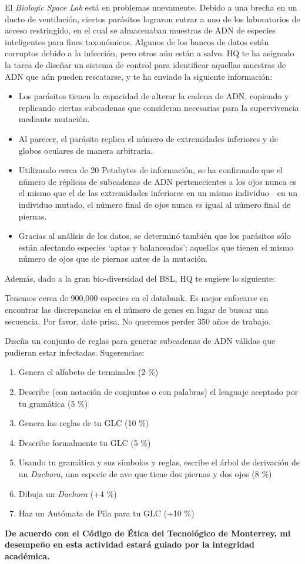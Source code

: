 \documentclass[8pt, onside]{article}
\begin{document}
El \textit{Biologic Space Lab} está en problemas nuevamente.
Debido a una brecha en un ducto de ventilación, ciertos parásitos lograron entrar a uno de los laboratorios de acceso restringido, en el cual se almacenaban muestras de ADN de especies inteligentes para fines taxonómicos.
Algunos de los bancos de datos están corruptos debido a la infección, pero otros aún están a salvo.
HQ te ha asignado la tarea de diseñar un sistema de control para identificar aquellas muestras de ADN que aún pueden rescatarse, y te ha enviado la siguiente información:

\begin{itemize}
    \itemsep0em
    \item Los parásitos tienen la capacidad de alterar la cadena de ADN, copiando y replicando ciertas subcadenas que consideran necesarias para la supervivencia mediante mutación.
    \item Al parecer, el parásito replica el número de extremidades inferiores y de globos oculares de manera arbitraria.
    \item Utilizando cerca de 20 Petabytes de información, se ha confirmado que el número de réplicas de subcadenas de ADN pertenecientes a los ojos nunca es el mismo que el de las extremidades inferiores en un mismo individuo---en un individuo mutado, el número final de ojos nunca es igual al número final de piernas.
    \item Gracias al análisis de los datos, se determinó también que los parásitos sólo están afectando especies `aptas y balanceadas'; aquellas que tienen el mismo número de ojos que de piernas antes de la mutación.
\end{itemize}

Además, dado a la gran bio-diversidad del BSL, HQ te sugiere lo siguiente:

\begin{tcolorbox}
{\small Tenemos cerca de 900,000 especies en el databank.
Es mejor enfocarse en encontrar las discrepancias en el número de genes en lugar de buscar una secuencia.
Por favor, date prisa. No queremos perder 350 años de trabajo.}
\end{tcolorbox}

Diseña un conjunto de reglas para generar subcadenas de ADN válidas que pudieran estar infectadas. Sugerencias:

\begin{enumerate}[label=\tt \alph*)]
    \item Genera el alfabeto de terminales (2 \%)
    \item Describe (con notación de conjuntos o con palabras) el lenguaje aceptado por tu gramática (5 \%)
    \item Genera las reglas de tu GLC (10 \%)
    \item Describe formalmente tu GLC (5 \%)
    \item Usando tu gramática y sus símbolos y reglas, escribe el árbol de derivación de un \textit{Dachora}, una especie de ave que tiene dos piernas y dos ojos (8 \%)
    \item Dibuja un \textit{Dachora} (+4 \%)
    \item Haz un Autómata de Pila para tu GLC (+10 \%)
\end{enumerate}

\vfill

\textbf{De acuerdo con el Código de Ética del Tecnológico de Monterrey, mi desempeño en esta actividad estará guiado por la integridad académica.}
\end{document}
